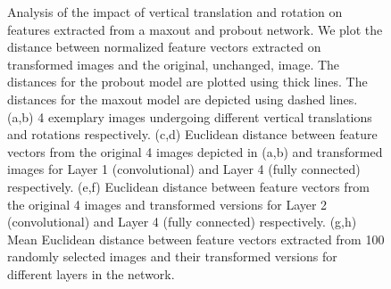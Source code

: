\documentclass{article} \pdfoutput=1
\begin{document}
\begin{figure}[h]
\begin{subfigure}[b]{0.48\columnwidth}
  \caption{}
  \label{rotation_single_plot}
\end{subfigure}
\caption{Analysis of the impact of vertical translation and rotation
  on features extracted from a maxout and probout network. We plot the
  distance between normalized feature vectors extracted on transformed
  images and the original, unchanged, image. The distances for the
  probout model are plotted using thick lines. The distances for the
  maxout model are depicted using dashed lines. (a,b) 4 exemplary images
  undergoing different vertical translations and rotations
  respectively. (c,d) Euclidean distance between feature vectors from
  the original 4 images depicted in (a,b) and transformed images for
  Layer 1 (convolutional) and Layer 4 (fully connected) respectively. (e,f) Euclidean distance between feature vectors from
  the original 4 images  and transformed versions for Layer 2
  (convolutional) and Layer 4 (fully connected) respectively.
  (g,h) Mean Euclidean distance between feature vectors extracted from
  100 randomly selected images and their transformed versions for
  different layers in the network.}
  \label{plots_invariance}
\end{figure}



{\footnotesize

}
\end{document}
